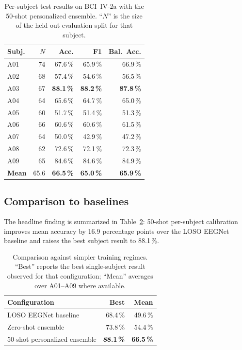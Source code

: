 \documentclass[conference]{IEEEtran}
\begin{document}
\begin{table}[!t]
\caption{Per-subject test results on BCI~IV-2a with the 50-shot
personalized ensemble. ``$N$'' is the size of the held-out evaluation
split for that subject.}
\label{tab:percent}
\centering
\small
\renewcommand{\arraystretch}{1.18}
\setlength{\tabcolsep}{4pt}
\begin{tabular}{@{}l r r r r@{}}
\toprule
\textbf{Subj.} & \textbf{$N$} &
  \textbf{Acc.} & \textbf{F1} & \textbf{Bal.\ Acc.} \\
\midrule
A01 & 74 & 67.6\,\% & 65.9\,\% & 66.9\,\% \\
A02 & 68 & 57.4\,\% & 54.6\,\% & 56.5\,\% \\
A03 & 67 & \textbf{88.1\,\%} & \textbf{88.2\,\%} & \textbf{87.8\,\%} \\
A04 & 64 & 65.6\,\% & 64.7\,\% & 65.0\,\% \\
A05 & 60 & 51.7\,\% & 51.4\,\% & 51.3\,\% \\
A06 & 66 & 60.6\,\% & 60.6\,\% & 61.5\,\% \\
A07 & 64 & 50.0\,\% & 42.9\,\% & 47.2\,\% \\
A08 & 62 & 72.6\,\% & 72.1\,\% & 72.3\,\% \\
A09 & 65 & 84.6\,\% & 84.6\,\% & 84.9\,\% \\
\midrule
\textbf{Mean} & 65.6 &
  \textbf{66.5\,\%} & \textbf{65.0\,\%} & \textbf{65.9\,\%} \\
\bottomrule
\end{tabular}
\end{table}

\subsection{Comparison to baselines}

The headline finding is summarized in Table~\ref{tab:baselines}: 50-shot
per-subject calibration improves mean accuracy by 16.9 percentage points over
the LOSO EEGNet baseline and raises the best subject result to 88.1\,\%.

\begin{table}[!t]
\caption{Comparison against simpler training regimes. ``Best'' reports the
best single-subject result observed for that configuration; ``Mean'' averages
over A01--A09 where available.}
\label{tab:baselines}
\centering
\small
\renewcommand{\arraystretch}{1.15}
\setlength{\tabcolsep}{4pt}
\begin{tabular}{@{}l r r@{}}
\toprule
\textbf{Configuration} &
  \textbf{Best} & \textbf{Mean} \\
\midrule
LOSO EEGNet baseline                & 68.4\,\% & 49.6\,\% \\
Zero-shot ensemble                  & 73.8\,\% & 54.4\,\% \\
50-shot personalized ensemble       & \textbf{88.1\,\%} &
                                      \textbf{66.5\,\%} \\
\bottomrule
\end{tabular}
\end{table}
\end{document}
